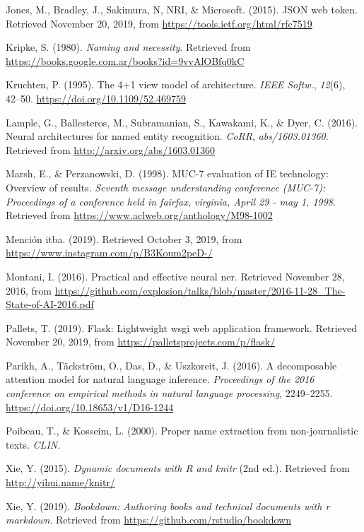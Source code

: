 \documentclass[12pt,a4paper,]{scrartcl}
\begin{document}
\leavevmode\hypertarget{ref-JWT}{}%
Jones, M., Bradley, J., Sakimura, N, NRI, \& Microsoft. (2015). JSON web token. Retrieved November 20, 2019, from \url{https://tools.ietf.org/html/rfc7519}

\leavevmode\hypertarget{ref-kripke1980naming}{}%
Kripke, S. (1980). \emph{Naming and necessity}. Retrieved from \url{https://books.google.com.ar/books?id=9vvAlOBfq0kC}

\leavevmode\hypertarget{ref-Kruchten:1995:VMA:624610.625529}{}%
Kruchten, P. (1995). The 4+1 view model of architecture. \emph{IEEE Softw.}, \emph{12}(6), 42--50. \url{https://doi.org/10.1109/52.469759}

\leavevmode\hypertarget{ref-DBLP:journalsux2fcorrux2fLampleBSKD16}{}%
Lample, G., Ballesteros, M., Subramanian, S., Kawakami, K., \& Dyer, C. (2016). Neural architectures for named entity recognition. \emph{CoRR}, \emph{abs/1603.01360}. Retrieved from \url{http://arxiv.org/abs/1603.01360}

\leavevmode\hypertarget{ref-marsh-perzanowski-1998-muc}{}%
Marsh, E., \& Perzanowski, D. (1998). MUC-7 evaluation of IE technology: Overview of results. \emph{Seventh message understanding conference (MUC-7): Proceedings of a conference held in fairfax, virginia, April 29 - may 1, 1998}. Retrieved from \url{https://www.aclweb.org/anthology/M98-1002}

\leavevmode\hypertarget{ref-mediaparty2019_win}{}%
Mención itba. (2019). Retrieved October 3, 2019, from \url{https://www.instagram.com/p/B3Koum2peD-/}

\leavevmode\hypertarget{ref-montani_AI}{}%
Montani, I. (2016). Practical and effective neural ner. Retrieved November 28, 2016, from \url{https://github.com/explosion/talks/blob/master/2016-11-28_The-State-of-AI-2016.pdf}

\leavevmode\hypertarget{ref-flask}{}%
Pallets, T. (2019). Flask: Lightweight wsgi web application framework. Retrieved November 20, 2019, from \url{https://palletsprojects.com/p/flask/}

\leavevmode\hypertarget{ref-parikh-etal-2016-decomposable}{}%
Parikh, A., Täckström, O., Das, D., \& Uszkoreit, J. (2016). A decomposable attention model for natural language inference. \emph{Proceedings of the 2016 conference on empirical methods in natural language processing}, 2249--2255. \url{https://doi.org/10.18653/v1/D16-1244}

\leavevmode\hypertarget{ref-Poibeau2000ProperNE}{}%
Poibeau, T., \& Kosseim, L. (2000). Proper name extraction from non-journalistic texts. \emph{CLIN}.

\leavevmode\hypertarget{ref-xie2015}{}%
Xie, Y. (2015). \emph{Dynamic documents with R and knitr} (2nd ed.). Retrieved from \url{http://yihui.name/knitr/}

\leavevmode\hypertarget{ref-R-bookdown}{}%
Xie, Y. (2019). \emph{Bookdown: Authoring books and technical documents with r markdown}. Retrieved from \url{https://github.com/rstudio/bookdown}
\end{document}
